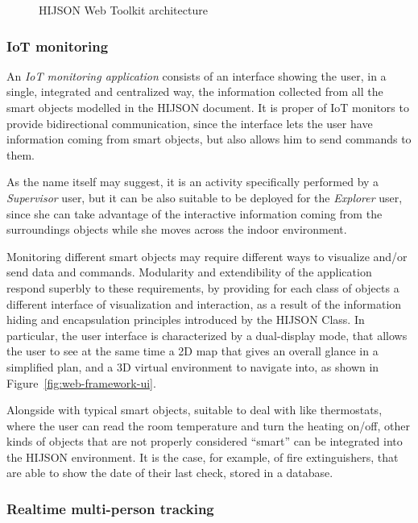 \begin{figure*}[htb]
\centering
{}
\caption{HIJSON Web Toolkit architecture}
\label{fig:architecture}
\end{figure*}


\subsubsection{IoT monitoring}\label{iot-monitoring}

An \emph{IoT monitoring application} consists of an interface showing the
user, in a single, integrated and centralized way, the information collected
from all the smart objects modelled in the HIJSON document. It is proper of
IoT monitors to provide bidirectional communication, since the interface lets
the user have information coming from smart objects, but also allows him to
send commands to them.

As the name itself may suggest, it is an activity specifically performed by a
\emph{Supervisor} user, but it can be also suitable to be deployed for the
\emph{Explorer} user, since she can take advantage of the interactive
information coming from the surroundings objects while she moves across the
indoor environment.

Monitoring different smart objects may require different ways to visualize
and/or send data and commands. Modularity and extendibility of the application
respond superbly to these requirements, by providing for each class of objects
a different interface of visualization and interaction, as a result of the
information hiding and encapsulation principles introduced by the HIJSON
Class. In particular, the user interface is characterized by a dual-display
mode, that allows the user to see at the same time a 2D map that gives an
overall glance in a simplified plan, and a 3D virtual environment to navigate
into, as shown in Figure~\ref{fig:web-framework-ui}.

Alongside with typical smart objects, suitable to deal with like thermostats,
where the user can read the room  temperature and turn the heating on/off,
other kinds of objects that are not properly considered ``smart'' can be
integrated into the HIJSON environment. It is the case, for example, of fire
extinguishers, that are able to show the date of their last check, stored in a
database.

\subsubsection{Realtime multi-person tracking}\label{realtime-multi-person-tracking}

